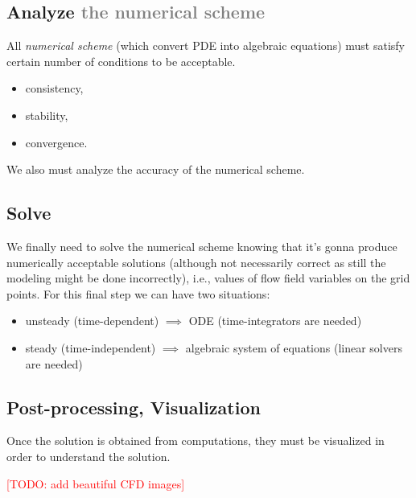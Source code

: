 \subsection{Analyze \textcolor{gray}{the numerical scheme}}

All \emph{numerical scheme} (which convert PDE into algebraic equations) must satisfy certain number of conditions to be acceptable.
%
\begin{itemize}
  \item consistency,
  \item stability,
  \item convergence.
\end{itemize}
%
We also must analyze the accuracy of the numerical scheme.


\subsection{Solve}

We finally need to solve the numerical scheme knowing that it's gonna produce numerically acceptable solutions (although not necessarily correct as still the modeling might be done incorrectly), i.e., values of flow field variables on the grid points.
For this final step we can have two situations:
%
\begin{itemize}
  \item unsteady (time-dependent) \(\implies\) ODE (time-integrators are needed)
  \item steady (time-independent) \(\implies\) algebraic system of equations (linear solvers are needed)
\end{itemize}


\subsection{Post-processing, Visualization}

Once the solution is obtained from computations, they must be visualized in order to understand the solution.

\textcolor{red}{[TODO: add beautiful CFD images]}

